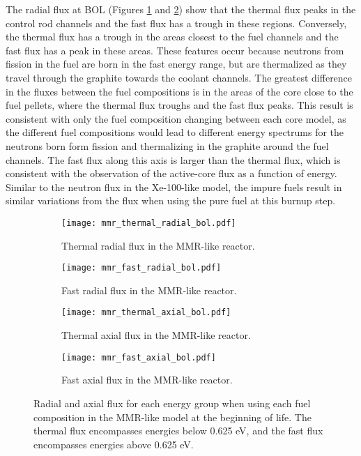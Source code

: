The radial flux at \gls{BOL} (Figures \ref{fig:mmr_thermal_radial_bol} and 
\ref{fig:mmr_fast_radial_bol}) show that the thermal flux peaks in the 
control rod channels and the fast flux has a trough in these regions. 
Conversely, the thermal flux has a trough in the areas closest to the fuel 
channels and the fast flux has a peak in these areas. These features occur 
because neutrons from fission in the fuel are born in the fast energy 
range, but are thermalized as they travel through the graphite towards 
the coolant channels. 
The greatest difference in the 
fluxes between the fuel compositions is in the areas of the core close 
to the fuel pellets, where the thermal flux troughs and the fast flux 
peaks. This result is consistent with only the fuel 
composition changing between each core model, as the different fuel 
compositions would lead to different energy spectrums for the neutrons 
born form fission and thermalizing in the graphite around the fuel channels.
The fast flux along this axis is larger than the thermal flux, which is 
consistent with the observation of the active-core flux as a function of 
energy. Similar to the neutron flux in the Xe-100-like model, the 
impure fuels result in similar variations from the flux when 
using the pure fuel at this burnup step.

\begin{figure}[h!]
        \centering
        \begin{subfigure}[b]{0.48\textwidth}
            \centering
            \texttt{[image: mmr\_thermal\_radial\_bol.pdf]}
            \caption{Thermal radial flux in the \gls{MMR}-like reactor.}
            \label{fig:mmr_thermal_radial_bol}
        \end{subfigure}
        \hfill
        \begin{subfigure}[b]{0.48\textwidth}
            \centering
            \texttt{[image: mmr\_fast\_radial\_bol.pdf]}
            \caption{Fast radial flux in the \gls{MMR}-like reactor.}
            \label{fig:mmr_fast_radial_bol}
        \end{subfigure}
        \hfill            
        \begin{subfigure}[b]{0.48\textwidth}
            \centering
            \texttt{[image: mmr\_thermal\_axial\_bol.pdf]}
            \caption{Thermal axial flux in the \gls{MMR}-like reactor. }
            \label{fig:mmr_thermal_axial_bol}
        \end{subfigure}
        \hfill
        \begin{subfigure}[b]{0.48\textwidth}
            \centering
            \texttt{[image: mmr\_fast\_axial\_bol.pdf]}
            \caption{Fast axial flux in the \gls{MMR}-like reactor.}
            \label{fig:mmr_fast_axial_bol}
        \end{subfigure}
        \hfill
        \caption{Radial and axial flux for each energy group when using 
        each fuel composition in the \gls{MMR}-like model at the beginning 
        of life. The thermal flux encompasses energies below 0.625 eV, and the 
        fast flux encompasses energies above 0.625 eV.}
        \label{fig:mmr_bol}
   \end{figure}

